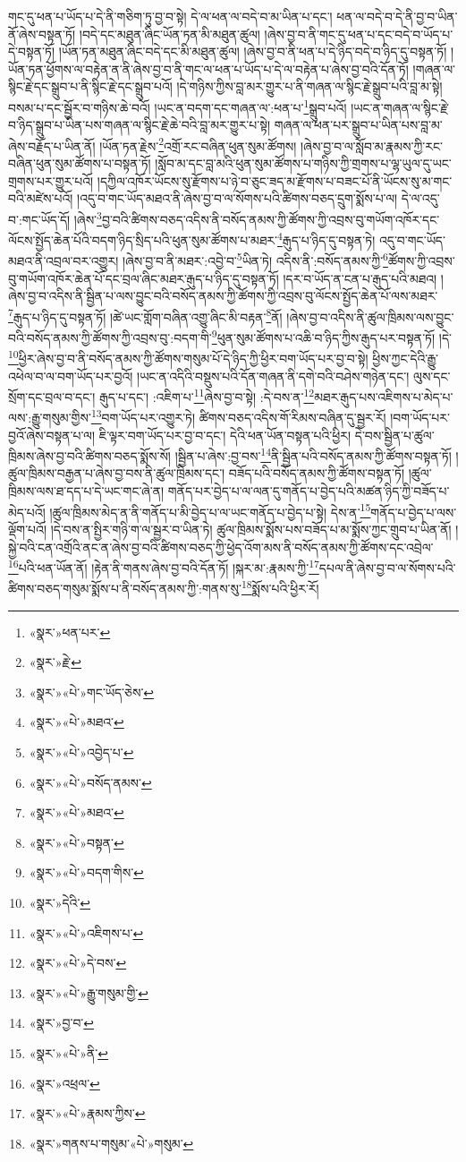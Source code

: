 གང་དུ་ཕན་པ་ཡོད་པ་དེ་ནི་གཅིག་ཏུ་བྱ་བ་སྟེ། དེ་ལ་ཕན་ལ་བདེ་བ་མ་ཡིན་པ་དང་། ཕན་ལ་བདེ་བ་དེ་ནི་བྱ་བ་ཡིན་ནོ་ཞེས་བསྟན་ཏོ། །བདེ་དང་མཐུན་ཞིང་ཡོན་ཏན་མི་མཐུན་ཚུལ། །ཞེས་བྱ་བ་ནི་གང་དུ་ཕན་པ་དང་བདེ་བ་ཡོད་པ་དེ་བསྟན་ཏོ། །ཡོན་ཏན་མཐུན་ཞིང་བདེ་དང་མི་མཐུན་ཚུལ། །ཞེས་བྱ་བ་ནི་ཕན་པ་དེ་ཉིད་བདེ་བ་ཉིད་དུ་བསྟན་ཏོ། །ཡོན་ཏན་ཕྱོགས་ལ་བརྟེན་ན་ནི་ཞེས་བྱ་བ་ནི་གང་ལ་ཕན་པ་ཡོད་པ་དེ་ལ་བརྟེན་པ་ཞེས་བྱ་བའི་དོན་ཏོ། །གཞན་ལ་སྙིང་རྗེ་དང་སྒྲུབ་པ་ནི་སྙིང་རྗེ་དང་སྒྲུབ་པའོ། །དེ་གཉིས་ཀྱིས་བླ་མར་གྱུར་པ་ནི་གཞན་ལ་སྙིང་རྗེ་སྒྲུབ་པའི་བླ་མ་སྟེ། བསམ་པ་དང་སྦྱོར་བ་གཉིས་ཆེ་བའོ། །ཡང་ན་བདག་དང་གཞན་ལ་:ཕན་པ་\footnote{«སྣར་»ཕན་པར་}སྒྲུབ་པའོ། །ཡང་ན་གཞན་ལ་སྙིང་རྗེ་བ་ཉིད་སྒྲུབ་པ་ཡིན་པས་གཞན་ལ་སྙིང་རྗེ་ཆེ་བའི་བླ་མར་གྱུར་པ་སྟེ། གཞན་ལ་ཕན་པར་སྒྲུབ་པ་ཡིན་པས་བླ་མ་ཞེས་བརྗོད་པ་ཡིན་ནོ། །ཡོན་ཏན་རྗེས་\footnote{«སྣར་»རྗེ་}འགྲོ་རང་བཞིན་ཕུན་སུམ་ཚོགས། །ཞེས་བྱ་བ་ལ་སློབ་མ་རྣམས་ཀྱི་རང་བཞིན་ཕུན་སུམ་ཚོགས་པ་བསྟན་ཏོ། །སློབ་མ་དང་བླ་མའི་ཕུན་སུམ་ཚོགས་པ་གཉིས་ཀྱི་གྲགས་པ་ལྷ་ཡུལ་དུ་ཡང་གྲགས་པར་གྱུར་པའོ། །དཀྱིལ་འཁོར་ཡོངས་སུ་རྫོགས་པ་ཉེ་བ་ཅུང་ཟད་མ་རྫོགས་པ་བཟང་པོ་ནི་ཡོངས་སུ་མ་གང་བའི་མཛེས་པའོ། །འདུ་བ་གང་ཡོད་མཐའ་ནི་ཞེས་བྱ་བ་ལ་སོགས་པའི་ཚིགས་བཅད་དྲུག་སྨོས་པ་ལ། དེ་ལ་འདུ་བ་:གང་ཡོད་དོ། །ཞེས་\footnote{«སྣར་»«པེ་»གང་ཡོད་ཅེས་}བྱ་བའི་ཚིགས་བཅད་འདིས་ནི་བསོད་ནམས་ཀྱི་ཚོགས་ཀྱི་འབྲས་བུ་གཡོག་འཁོར་དང་ལོངས་སྤྱོད་ཆེན་པོའི་བདག་ཉིད་སྲིད་པའི་ཕུན་སུམ་ཚོགས་པ་མཐར་\footnote{«སྣར་»«པེ་»མཐའ་}རྒུད་པ་ཉིད་དུ་བསྟན་ཏེ། འདུ་བ་གང་ཡོད་མཐའ་ནི་འབྲལ་བར་འགྱུར། །ཞེས་བྱ་བ་ནི་མཐར་:འབྱེ་བ་\footnote{«སྣར་»«པེ་»འབྱེད་པ་}ཡིན་ཏེ། འདིས་ནི་:བསོད་ནམས་ཀྱི་\footnote{«སྣར་»«པེ་»བསོད་ནམས་}ཚོགས་ཀྱི་འབྲས་བུ་གཡོག་འཁོར་ཆེན་པོ་དང་བྲལ་ཞིང་མཐར་རྒུད་པ་ཉིད་དུ་བསྟན་ཏོ། །དར་བ་ཡོད་ན་ངན་པ་རྒུད་པའི་མཐའ། །ཞེས་བྱ་བ་འདིས་ནི་སྦྱིན་པ་ལས་བྱུང་བའི་བསོད་ནམས་ཀྱི་ཚོགས་ཀྱི་འབྲས་བུ་ལོངས་སྤྱོད་ཆེན་པོ་ལས་མཐར་\footnote{«སྣར་»«པེ་»མཐའ་}རྒུད་པ་ཉིད་དུ་བསྟན་ཏོ། །ཚེ་ཡང་གློག་བཞིན་འགྱུ་ཞིང་མི་བརྟན་\footnote{«སྣར་»«པེ་»བསྟན་}ནོ། །ཞེས་བྱ་བ་འདིས་ནི་ཚུལ་ཁྲིམས་ལས་བྱུང་བའི་བསོད་ནམས་ཀྱི་ཚོགས་ཀྱི་འབྲས་བུ་:བདག་གི་\footnote{«སྣར་»«པེ་»བདག་གིས་}ཕུན་སུམ་ཚོགས་པ་འཆི་བ་ཉིད་ཀྱིས་རྒུད་པར་བསྟན་ཏོ། །དེ་\footnote{«སྣར་»དེའི་}ཕྱིར་ཞེས་བྱ་བ་ནི་བསོད་ནམས་ཀྱི་ཚོགས་གསུམ་པོ་དེ་ཉིད་ཀྱི་ཕྱིར་བག་ཡོད་པར་བྱ་བ་སྟེ། ཕྱིས་ཀྱང་དེའི་རྒྱུ་འཕེལ་བ་ལ་བག་ཡོད་པར་བྱའོ། །ཡང་ན་འདིའི་བསྡུས་པའི་དོན་གཞན་ནི་དགེ་བའི་བཤེས་གཉེན་དང་། ལུས་དང་སྲོག་དང་བྲལ་བ་དང་། རྒུད་པ་དང་། :འཇིག་པ་\footnote{«སྣར་»«པེ་»འཇིགས་པ་}ཞེས་བྱ་བ་སྟེ། :དེ་བས་ན་\footnote{«སྣར་»«པེ་»དེ་བས་}མཐར་རྒུད་པས་འཇིགས་པ་མེད་པ་ལས་:རྒྱུ་གསུམ་གྱིས་\footnote{«སྣར་»«པེ་»རྒྱུ་གསུམ་གྱི་}བག་ཡོད་པར་འགྱུར་ཏེ། ཚིགས་བཅད་འདིས་གོ་རིམས་བཞིན་དུ་སྦྱར་རོ། །བག་ཡོད་པར་བྱའོ་ཞེས་བསྟན་པ་ལ། ཇི་ལྟར་བག་ཡོད་པར་བྱ་བ་དང་། དེའི་ཕན་ཡོན་བསྟན་པའི་ཕྱིར། དེ་བས་སྦྱིན་པ་ཚུལ་ཁྲིམས་ཞེས་བྱ་བའི་ཚིགས་བཅད་སྨོས་སོ། །སྦྱིན་པ་ཞེས་:བྱ་བས་\footnote{«སྣར་»བྱ་བ་}ནི་སྦྱིན་པའི་བསོད་ནམས་ཀྱི་ཚོགས་བསྟན་ཏོ། །ཚུལ་ཁྲིམས་བརྒྱན་པ་ཞེས་བྱ་བས་ནི་ཚུལ་ཁྲིམས་དང་། བཟོད་པའི་བསོད་ནམས་ཀྱི་ཚོགས་བསྟན་ཏོ། །ཚུལ་ཁྲིམས་ལས་ཐ་དད་པ་དེ་ཡང་གང་ཞེ་ན། གནོད་པར་བྱེད་པ་ལ་ལན་དུ་གནོད་པ་བྱེད་པའི་མཚན་ཉིད་ཀྱི་བཟོད་པ་མེད་པའོ། །ཚུལ་ཁྲིམས་མེད་ན་ནི་གནོད་པ་མི་བྱེད་པ་ལ་ཡང་གནོད་པ་བྱེད་པ་སྟེ། དེས་ན་\footnote{«སྣར་»«པེ་»ནི་}གནོད་པ་བྱེད་པ་ལས་ལྡོག་པའོ། །དེ་བས་ན་སྤྱིར་གཉི་ག་ལ་སྦྱར་བ་ཡིན་ཏེ། ཚུལ་ཁྲིམས་སྨོས་པས་བཟོད་པ་མ་སྨོས་ཀྱང་གྲུབ་པ་ཡིན་ནོ། །སྐྱེ་བའི་ངན་འགྲོའི་ནང་ན་ཞེས་བྱ་བའི་ཚིགས་བཅད་ཀྱི་ཕྱེད་འོག་མས་ནི་བསོད་ནམས་ཀྱི་ཚོགས་དང་འབྲེལ་\footnote{«སྣར་»འཕྲལ་}པའི་ཕན་ཡོན་ནོ། །རྟེན་ནི་གནས་ཞེས་བྱ་བའི་དོན་ཏོ། །སྐར་མ་:རྣམས་ཀྱི་\footnote{«སྣར་»«པེ་»རྣམས་ཀྱིས་}དཔལ་ནི་ཞེས་བྱ་བ་ལ་སོགས་པའི་ཚིགས་བཅད་གསུམ་སྨོས་པ་ནི་བསོད་ནམས་ཀྱི་:གནས་སུ་\footnote{«སྣར་»གནས་པ་གསུམ་«པེ་»གསུམ་}སྨོས་པའི་ཕྱིར་རོ། 